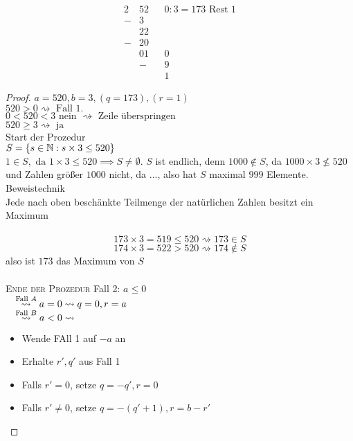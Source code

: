 \documentclass[consecutivenumbering]{gadsescript}
\begin{document}
\begin{alignat*}{2}
	&52&&0 : 3 = 173 \text{ Rest } 1\\
	-&3&&~\\
	&22&&~\\
	-&20&&~\\
	&01&&0\\
	&-&&9\\
	~&&&1
\end{alignat*}

\begin{proof}
	$ a = 520, b = 3, ( q = 173 ), ( r = 1 ) $\\
	$ 520 > 0 \rightsquigarrow \text{ Fall 1.} $\\
	$ 0 < 520 < 3 \text{ nein } \rightsquigarrow \text{ Zeile überspringen } $\\
	$ 520 \geq 3 \rightsquigarrow \text{ ja } $\\
	Start der Prozedur\\
	$ S = \{ s \in \mathbb{N} : s \times 3 \leq 520 \} $\\
	$ 1 \in S, \text{ da } 1 \times 3 \leq 520 \implies S \neq \emptyset $.
	$ S $ ist endlich, denn $ 1000 \notin S $, da $ 1000 \times 3 \nleq 520 $ und Zahlen größer $ 1000 $ nicht, da ..., also hat $ S $ maximal $ 999 $ Elemente.\\
	{\color{violet}
	Beweistechnik\\
	Jede nach oben beschänkte Teilmenge der natürlichen Zahlen besitzt ein Maximum
	}\\
	\\
	\[ 173 \times 3 = 519 \leq 520 \rightsquigarrow 173 \in S \]
	\[ 174 \times 3 = 522 > 520 \rightsquigarrow 174 \notin S \]
	also ist $ 173 $ das Maximum von $ S $\\
	\\
	{\color{red}\scshape Ende der Prozedur}
	Fall 2: $ a \leq 0 $\\
	$ \quad \overset{\text{Fall $ A $}}{\rightsquigarrow} a = 0 \rightsquigarrow q = 0, r = a $\\
	$ \quad \overset{\text{Fall $ B $}}{\rightsquigarrow} a < 0 \rightsquigarrow $\\
	\begin{itemize}
		\item Wende FAll 1 auf $ - a $ an
		\item Erhalte $ r\prime, q\prime $ aus Fall 1
		\item Falls $ r\prime = 0 $, setze $ q = -q\prime, r = 0 $
		\item Falls $ r\prime \neq 0 $, setze $ q = -(q\prime + 1), r = b - r\prime $
	\end{itemize}
\end{proof}
\end{document}
